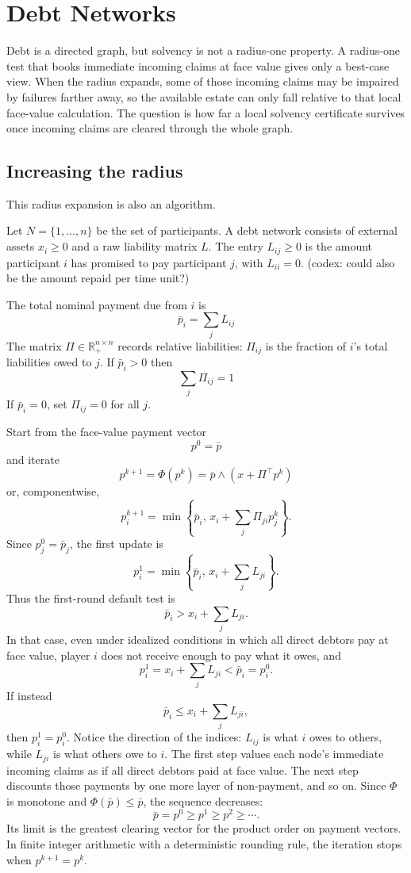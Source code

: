\documentclass[11pt,oneside]{article}
\newcommand{\R}{\mathbb{R}}
\newcommand{\barp}{\bar p}
\begin{document}
\section{Debt Networks}

Debt is a directed graph, but solvency is not a radius-one property. A
radius-one test that books immediate incoming claims at face value gives only a
best-case view. When the radius expands, some of those incoming claims may be
impaired by failures farther away, so the available estate can only fall
relative to that local face-value calculation. The question is how far a local
solvency certificate survives once incoming claims are cleared through the
whole graph.

\subsection{Increasing the radius}

This radius expansion is also an algorithm.

Let $N=\{1,\ldots,n\}$ be the set of participants. A debt network consists of
external assets $x_i\geq0$ and a raw liability matrix $L$. The entry
$L_{ij}\geq0$ is the amount participant $i$ has promised to pay participant
$j$, with $L_{ii}=0$. (codex: could also be the amount repaid per time unit?)


The total nominal payment due from $i$ is
\[
  \barp_i=\sum_j L_{ij}
\]
The matrix $\Pi \in \R_+^{n \times n}$ records relative liabilities:
$\Pi_{ij}$ is the fraction of $i$'s total liabilities owed to $j$. If
$\barp_i>0$ then
\[
  \sum_j \Pi_{ij}=1
\]
If $\barp_i=0$, set $\Pi_{ij}=0$ for all $j$.


Start from the face-value payment vector
\[
  p^0=\barp
\]
and iterate
\[
  p^{k+1}=\Phi(p^k)=\barp\wedge(x+\Pi^\top p^k)
\]
or, componentwise,
\[
  p_i^{k+1}
  =
  \min\left\{
    \barp_i,\,
    x_i+\sum_j\Pi_{ji}p_j^k
  \right\}.
\]
Since $p^0_j=\barp_j$, the first update is
\[
  p_i^1
  =
  \min\left\{
    \barp_i,\,
    x_i+\sum_j L_{ji}
  \right\}.
\]
Thus the first-round default test is
\[
  \barp_i>x_i+\sum_jL_{ji}.
\]
In that case, even under idealized conditions in which all direct debtors pay
at face value, player $i$ does not receive enough to pay what it owes, and
\[
  p_i^1=x_i+\sum_jL_{ji}<\barp_i=p_i^0.
\]
If instead
\[
  \barp_i\leq x_i+\sum_jL_{ji},
\]
then $p_i^1=p_i^0$. Notice the direction of the indices: $L_{ij}$ is what
$i$ owes to others, while $L_{ji}$ is what others owe to $i$.
The first step values each node's immediate incoming claims as if all direct
debtors paid at face value. The next step discounts those payments by one more
layer of non-payment, and so on. Since $\Phi$ is monotone and
$\Phi(\barp)\leq\barp$, the sequence decreases:
\[
  \barp=p^0\geq p^1\geq p^2\geq\cdots.
\]
Its limit is the greatest clearing vector for the product order on payment
vectors. In finite integer arithmetic with a deterministic rounding rule, the
iteration stops when $p^{k+1}=p^k$.
\end{document}
